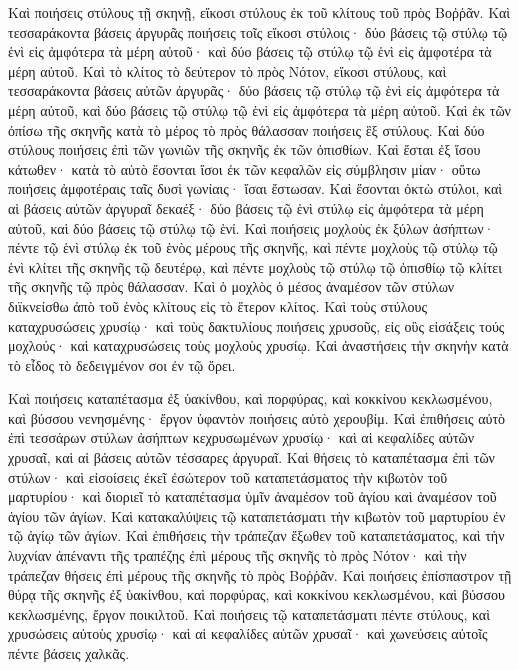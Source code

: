 {Καὶ ποιήσεις στύλους τῇ σκηνῇ, εἴκοσι στύλους ἐκ τοῦ κλίτους τοῦ πρὸς Βοῤῥᾶν.
Καὶ τεσσαράκοντα βάσεις ἀργυρᾶς ποιήσεις τοῖς εἴκοσι στύλοις· δύο βάσεις τῷ στύλῳ τῷ ἑνὶ εἰς ἀμφότερα τὰ μέρη αὐτοῦ· καὶ δύο βάσεις τῷ στύλῳ τῷ ἑνὶ εἰς ἀμφοτέρα τὰ μέρη αὐτοῦ.
Καὶ τὸ κλίτος τὸ δεύτερον τὸ πρὸς Νότον, εἴκοσι στύλους,
καὶ τεσσαράκοντα βάσεις αὐτῶν ἀργυρᾶς· δύο βάσεις τῷ στύλῳ τῷ ἑνὶ εἰς ἀμφότερα τὰ μέρη αὐτοῦ, καὶ δύο βάσεις τῷ στύλῳ τῷ ἑνὶ εἰς ἀμφότερα τὰ μέρη αὐτοῦ.
Καὶ ἐκ τῶν ὀπίσω τῆς σκηνῆς κατὰ τὸ μέρος τὸ πρὸς θάλασσαν ποιήσεις ἓξ στύλους.
Καὶ δύο στύλους ποιήσεις ἐπὶ τῶν γωνιῶν τῆς σκηνῆς ἐκ τῶν ὀπισθίων.
Καὶ ἔσται ἐξ ἴσου κάτωθεν· κατὰ τὸ αὐτὸ ἔσονται ἴσοι ἐκ τῶν κεφαλῶν εἰς σύμβλησιν μίαν· οὕτω ποιήσεις ἀμφοτέραις ταῖς δυσὶ γωνίαις· ἴσαι ἔστωσαν.
Καὶ ἔσονται ὀκτὼ στύλοι, καὶ αἱ βάσεις αὐτῶν ἀργυραῖ δεκαέξ· δύο βάσεις τῷ ἑνὶ στύλῳ εἰς ἀμφότερα τὰ μέρη αὐτοῦ, καὶ δύο βάσεις τῷ στύλῳ τῷ ἑνί.
Καὶ ποιήσεις μοχλοὺς ἐκ ξύλων ἀσήπτων· πέντε τῷ ἑνὶ στύλῳ ἐκ τοῦ ἑνὸς μέρους τῆς σκηνῆς,
καὶ πέντε μοχλοὺς τῷ στύλῳ τῷ ἑνὶ κλίτει τῆς σκηνῆς τῷ δευτέρῳ, καὶ πέντε μοχλοὺς τῷ στύλῳ τῷ ὀπισθίῳ τῷ κλίτει τῆς σκηνῆς τῷ πρὸς θάλασσαν.
Καὶ ὁ μοχλὸς ὁ μέσος ἀναμέσον τῶν στύλων διϊκνείσθω ἀπὸ τοῦ ἑνὸς κλίτους εἰς τὸ ἕτερον κλίτος.
Καὶ τοὺς στύλους καταχρυσώσεις χρυσίῳ· καὶ τοὺς δακτυλίους ποιήσεις χρυσοῦς, εἰς οὓς εἰσάξεις τούς μοχλούς· καὶ καταχρυσώσεις τοὺς μοχλοὺς χρυσίῳ.
Καὶ ἀναστήσεις τὴν σκηνὴν κατὰ τὸ εἶδος τὸ δεδειγμένον σοι ἐν τῷ ὄρει.
\par }{\PP {}Καὶ ποιήσεις καταπέτασμα ἐξ ὑακίνθου, καὶ πορφύρας, καὶ κοκκίνου κεκλωσμένου, καὶ βύσσου νενησμένης· ἔργον ὑφαντὸν ποιήσεις αὐτὸ χερουβίμ.
Καὶ ἐπιθήσεις αὐτὸ ἐπὶ τεσσάρων στύλων ἀσήπτων κεχρυσωμένων χρυσίῳ· καὶ αἱ κεφαλίδες αὐτῶν χρυσαῖ, καὶ αἱ βάσεις αὐτῶν τέσσαρες ἀργυραῖ.
Καὶ θήσεις τὸ καταπέτασμα ἐπὶ τῶν στύλων· καὶ εἰσοίσεις ἐκεῖ ἐσώτερον τοῦ καταπετάσματος τὴν κιβωτὸν τοῦ μαρτυρίου· καὶ διοριεῖ τὸ καταπέτασμα ὑμῖν ἀναμέσον τοῦ ἁγίου καὶ ἀναμέσον τοῦ ἁγίου τῶν ἁγίων.
Καὶ κατακαλύψεις τῷ καταπετάσματι τὴν κιβωτὸν τοῦ μαρτυρίου ἐν τῷ ἁγίῳ τῶν ἁγίων.
Καὶ ἐπιθήσεις τὴν τράπεζαν ἔξωθεν τοῦ καταπετάσματος, καὶ τὴν λυχνίαν ἀπέναντι τῆς τραπέζης ἐπὶ μέρους τῆς σκηνῆς τὸ πρὸς Νότον· καὶ τὴν τράπεζαν θήσεις ἐπὶ μέρους τῆς σκηνῆς τὸ πρὸς Βοῤῥᾶν.
Καὶ ποιήσεις ἐπίσπαστρον τῇ θύρᾳ τῆς σκηνῆς ἐξ ὑακίνθου, καὶ πορφύρας, καὶ κοκκίνου κεκλωσμένου, καὶ βύσσου κεκλωσμένης, ἔργον ποικιλτοῦ.
Καὶ ποιήσεις τῷ καταπετάσματι πέντε στύλους, καὶ χρυσώσεις αὐτοὺς χρυσίῳ· καὶ αἱ κεφαλίδες αὐτῶν χρυσαῖ· καὶ χωνεύσεις αὐτοῖς πέντε βάσεις χαλκᾶς.

}
